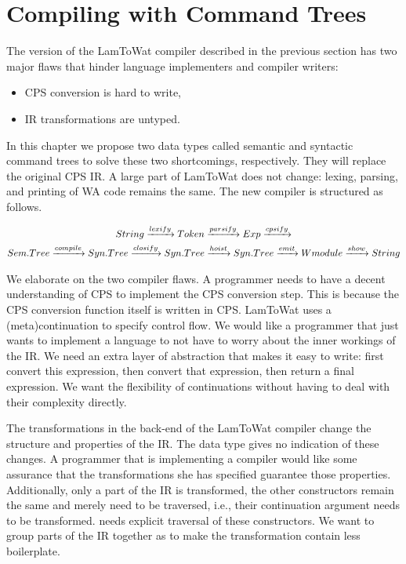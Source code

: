 
\chapter{\label{chap:treecomp}Compiling with Command Trees}
The version of the LamToWat compiler described in the previous section has two major flaws that hinder language implementers and compiler writers:

\begin{itemize}
\item \ac{CPS} conversion is hard to write,
\item \ac{IR} transformations are untyped.
\end{itemize}

In this chapter we propose two data types called semantic and syntactic command trees to solve these two shortcomings, respectively. They will replace the original \ac{CPS} \ac{IR}. A large part of LamToWat does not change: lexing, parsing, and printing of \ac{WA} code remains the same. The new compiler is structured as follows.

\begin{gather*}
  String \xrightarrow{lexify} Token \xrightarrow{parsify} Exp \xrightarrow{cpsify}\\
  Sem.Tree \xrightarrow{compile} Syn.Tree \xrightarrow{closify} Syn.Tree \xrightarrow{hoist} Syn.Tree \xrightarrow{emit} Wmodule \xrightarrow{show} String
\end{gather*}

We elaborate on the two compiler flaws. A programmer needs to have a decent understanding of \ac{CPS} to implement the \ac{CPS} conversion step. This is because the \ac{CPS} conversion function itself is written in \ac{CPS}. LamToWat uses a (meta)continuation to specify control flow. We would like a programmer that just wants to implement a language to not have to worry about the inner workings of the \ac{IR}. We need an extra layer of abstraction that makes it easy to write: first convert this expression, then convert that expression, then return a final expression. We want the flexibility of continuations without having to deal with their complexity directly.

The transformations in the back-end of the LamToWat compiler change the structure and properties of the \ac{IR}. The  data type gives no indication of these changes. A programmer that is implementing a compiler would like some assurance that the transformations she has specified guarantee those properties. Additionally, only a part of the \ac{IR} is transformed, the other constructors remain the same and merely need to be traversed, i.e., their continuation argument needs to be transformed.  needs explicit traversal of these constructors. We want to group parts of the \ac{IR} together as to make the transformation contain less boilerplate.


